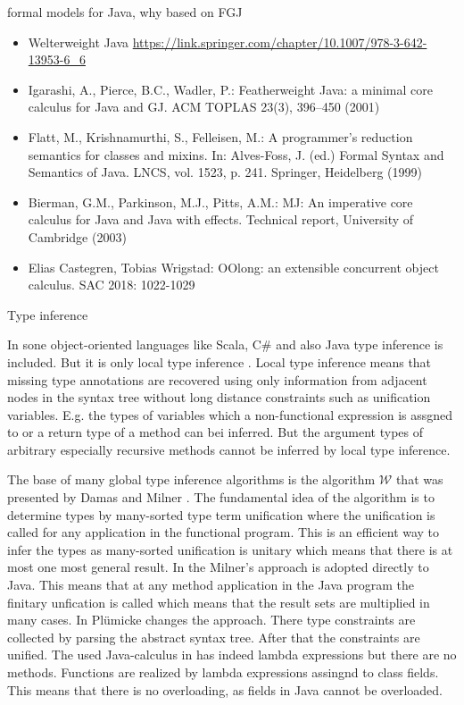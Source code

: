
formal models for Java, why based on FGJ

\begin{itemize}
\item Welterweight Java
  \url{https://link.springer.com/chapter/10.1007/978-3-642-13953-6_6}
\item Igarashi, A., Pierce, B.C., Wadler, P.: Featherweight Java: a
  minimal core calculus for Java and GJ. ACM TOPLAS 23(3), 396–450
  (2001)
\item Flatt, M., Krishnamurthi, S., Felleisen, M.: A programmer’s
  reduction semantics for classes and mixins. In: Alves-Foss, J. (ed.)
  Formal Syntax and Semantics of Java. LNCS, vol. 1523,
  p. 241. Springer, Heidelberg (1999)
\item Bierman, G.M., Parkinson, M.J., Pitts, A.M.: MJ: An imperative
  core calculus for Java and Java with effects. Technical report,
  University of Cambridge (2003) 
\item 	Elias Castegren, Tobias Wrigstad:
OOlong: an extensible concurrent object calculus. SAC 2018: 1022-1029
\end{itemize}

Type inference

In sone object-oriented languages like Scala, C\# and also Java type inference
is included. But it is only local type inference \cite{PT98,OZZ01}. Local type
inference means that missing type annotations are recovered using only
information from adjacent nodes in the syntax tree without long distance
constraints such as unification variables. E.g. the types of variables which
a non-functional expression is assgned to or a return type of a method can bei
inferred. But the argument types of arbitrary especially recursive methods
cannot be inferred by local type inference.

The base of many global type inference algorithms is the algorithm $\mathcal{W}$
that was presented by Damas and Milner \cite{DM82}. The fundamental idea
of the algorithm is to determine types by many-sorted type term
unification \cite{Rob65, MM82} where the unification is called for any
application in the functional program. This is an efficient way to infer the types
as many-sorted unification is unitary which means that there is at most one
most general result.  In \cite{Plue07_3} the Milner's approach is adopted
directly to Java. This means that at any method application in the Java program
the finitary unfication is called which means that the result sets are multiplied in
many cases. In \cite{plue15_2} Pl\"umicke changes the approach. There 
type constraints are collected by parsing the abstract syntax tree. After that the
constraints are unified. The used Java-calculus in \cite{plue15_2} has
indeed lambda expressions but there are no methods. Functions are realized by
lambda expressions assingnd to class fields. This means that there is no
overloading, as fields in Java cannot be overloaded.



